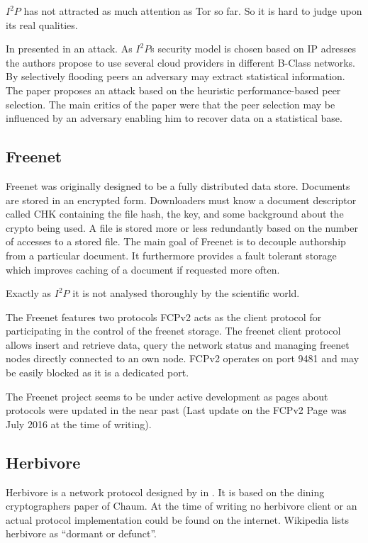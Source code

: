 $I^2P$ has not attracted as much attention as Tor so far. So it is hard to judge upon its real qualities.

In \citeyear{pets2011-i2p} \citeauthor{pets2011-i2p} presented in \cite{pets2011-i2p} an attack. As $I^2P$s security model is chosen based on IP adresses the authors propose to use several cloud providers in different B-Class networks. By selectively flooding peers an adversary may extract statistical information. The paper proposes an attack based on the heuristic performance-based peer selection. The main critics of the paper were that the peer selection may be influenced by an adversary enabling him to recover data on a statistical base.

\subsection{Freenet}
Freenet was originally designed to be a fully distributed data store\cite{freenet}. Documents are stored in an encrypted form. Downloaders must know a document descriptor called CHK containing the file hash, the key, and some background about the crypto being used. A file is stored more or less redundantly based on the number of accesses to a stored file. The main goal of Freenet is to decouple  authorship from a particular document. It furthermore provides a fault tolerant storage which improves caching of a document if requested more often.

Exactly as $I^2P$ it is not analysed thoroughly by the scientific world. 

The Freenet features two protocols FCPv2 acts as the client protocol for participating in the control of the freenet storage. The freenet client protocol allows insert and retrieve data, query the network status and managing freenet nodes directly connected to an own node. FCPv2 operates on port 9481 and may be easily blocked as it is a dedicated port. 

The Freenet project seems to be under active development as pages about protocols were updated in the near past (Last update on the FCPv2 Page was July  2016 at the time of writing).

\subsection{Herbivore}
Herbivore is a network protocol designed by \citeauthor{herbivore:tr} in \cite{herbivore:tr}. It is based on the dining cryptographers paper of Chaum. At the time of writing no herbivore client or an actual protocol implementation could be found on the internet. Wikipedia lists herbivore as ``dormant or defunct''.

